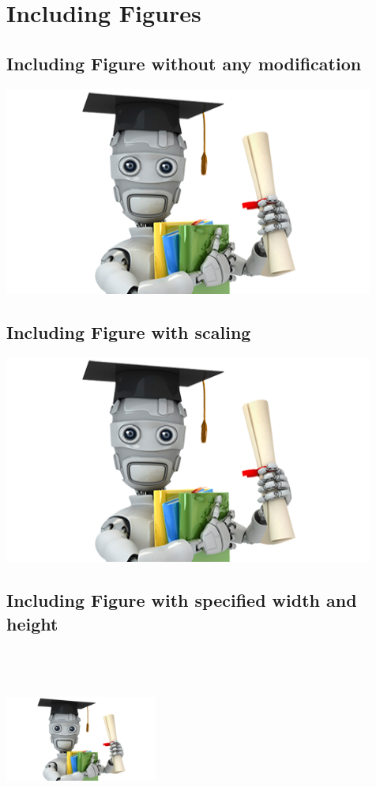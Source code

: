 \section{Including Figures}

\subsection{Including Figure without any modification}
\includegraphics{"machineLearning"}

\subsection{Including Figure with scaling}
\includegraphics[scale = 0.5]{"machineLearning"}


\subsection{Including Figure with specified width and height}
\includegraphics[width=5cm, height=6cm]{"machineLearning"}


